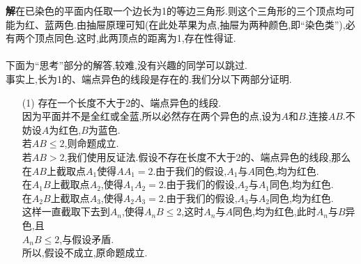 \documentclass[UTF8]{ctexart}
\begin{document}
\begin{enumerate}
\hspace*{2em}\textbf{解}\quad 在已染色的平面内任取一个边长为1的等边三角形.则这个三角形的三个顶点均可能为红、蓝两色.由抽屉原理可知(在此处苹果为点,抽屉为两种颜色,即“染色类”),必有两个顶点同色.这时,此两顶点的距离为1,存在性得证.\\
\\
\hspace*{2em}下面为“思考”部分的解答,较难,没有兴趣的同学可以跳过.\\
\hspace*{2em}事实上,长为1的、端点异色的线段是存在的.我们分以下两部分证明.\\
\begin{itemize}
\item[(1)]{\large{}存在一个长度不大于2的、端点异色的线段.}\\
\hspace*{2em}因为平面并不是全红或全蓝,所以必然存在两个异色的点,设为$A$和$B$.连接$AB$.不妨设$A$为红色,$B$为蓝色.\\
\hspace*{2em}若$AB\le2$,则命题成立.\\
\hspace*{2em}若$AB>2$,我们使用反证法.假设不存在长度不大于2的、端点异色的线段,那么在$AB$上截取点$A_1$使得$AA_1=2$.由于我们的假设,$A_1$与$A$同色,均为红色.\\
\hspace*{2em}在$A_1B$上截取点$A_2$,使得$A_1A_2=2$.由于我们的假设,$A_2$与$A_1$同色,均为红色.\\
\hspace*{2em}在$A_2B$上截取点$A_3$,使得$A_2A_3=2$.由于我们的假设,$A_3$与$A_2$同色,均为红色.\\
\hspace*{2em}这样一直截取下去到$A_n$,使得$A_nB\le2$,这时$A_n$与$A$同色,均为红色,此时$A_n$与$B$异色,且\\$A_nB\le2$,与假设矛盾.\\
\hspace*{2em}所以,假设不成立,原命题成立.\\
\begin{figure}[!ht]
\centering
{}
\end{figure}
\end{itemize}
\end{enumerate}
\end{document}
